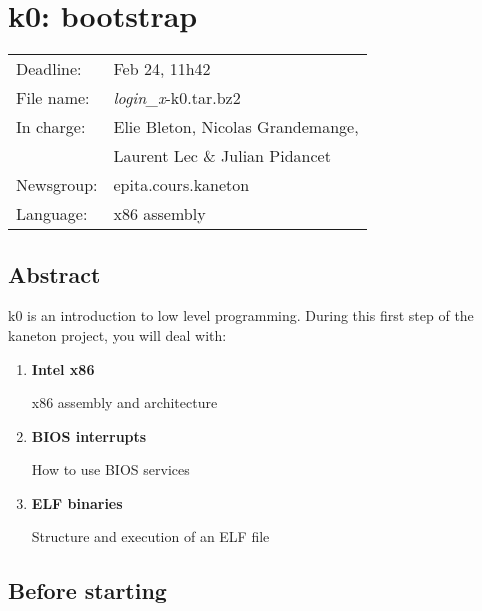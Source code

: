 
%
%

\chapter{k0: bootstrap}

%
%

\begin{tabular}{p{7cm}l}
Deadline: & Feb 24, 11h42 \\
File name: & {\em login\_x}-k0.tar.bz2 \\
In charge: & Elie Bleton, Nicolas Grandemange,\\
        & Laurent Lec \& Julian Pidancet\\
Newsgroup: & epita.cours.kaneton\\
Language: & x86 assembly\\
\end{tabular}

\section{Abstract}

k0 is an introduction to low level programming. During this first step of
the kaneton project, you will deal with:

\begin{enumerate}
  \item
    {\bf Intel x86}

    x86 assembly and architecture
  \item
    {\bf BIOS interrupts}

    How to use BIOS services
  \item
    {\bf ELF binaries}

    Structure and execution of an ELF file
\end{enumerate}

\clearpage

\section{Before starting}

